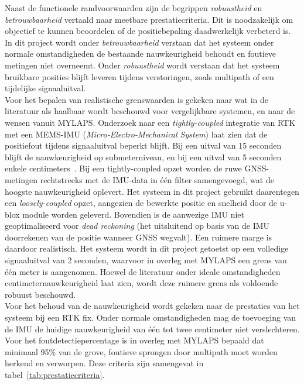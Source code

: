Naast de functionele randvoorwaarden zijn de begrippen \textit{robuustheid} en 
\textit{betrouwbaarheid} vertaald naar meetbare prestatiecriteria. Dit is noodzakelijk om objectief te kunnen beoordelen of de positiebepaling daadwerkelijk verbeterd is. In dit project wordt onder \textit{betrouwbaarheid} verstaan dat het systeem onder normale omstandigheden de bestaande nauwkeurigheid behoudt en foutieve metingen niet overneemt. Onder \textit{robuustheid} wordt verstaan dat het systeem bruikbare posities blijft leveren tijdens verstoringen, zoals multipath of een tijdelijke signaaluitval. \\

Voor het bepalen van realistische grenswaarden is gekeken naar wat in de literatuur als haalbaar wordt beschouwd voor vergelijkbare systemen, en naar de wensen vanuit MYLAPS. Onderzoek naar een \textit{tightly-coupled} integratie van RTK met een MEMS-IMU (\textit{Micro-Electro-Mechanical System}) laat zien dat de positiefout tijdens signaaluitval beperkt blijft. Bij een uitval van 15 seconden blijft de nauwkeurigheid op submeterniveau, en bij een uitval van 5 seconden enkele centimeters~\cite{li2017rtk}. Bij een tightly-coupled opzet worden de ruwe GNSS-metingen rechtstreeks met de IMU-data in één filter samengevoegd, wat de hoogste nauwkeurigheid oplevert. Het systeem in dit project gebruikt daarentegen een \textit{loosely-coupled} opzet, aangezien de bewerkte positie en snelheid door de u-blox module worden geleverd. Bovendien is de aanwezige IMU niet geoptimaliseerd voor \textit{dead reckoning} (het uitsluitend op basis van de IMU doorrekenen van de positie wanneer GNSS wegvalt). Een ruimere marge is daardoor realistisch. Het systeem wordt in dit project getoetst op een volledige signaaluitval van 2 seconden, waarvoor in overleg met MYLAPS een grens van één meter is aangenomen. Hoewel de literatuur onder ideale omstandigheden centimeternauwkeurigheid laat zien, wordt deze ruimere grens als voldoende robuust beschouwd. \\

Voor het behoud van de nauwkeurigheid wordt gekeken naar de prestaties van het systeem bij een RTK fix. Onder normale omstandigheden mag de toevoeging van de IMU de huidige nauwkeurigheid van één tot twee centimeter niet verslechteren. \\

Voor het foutdetectiepercentage is in overleg met MYLAPS bepaald dat minimaal 95\% van de grove, foutieve sprongen door multipath moet worden herkend en verworpen. Deze criteria zijn samengevat in tabel~\ref{tab:prestatiecriteria}.

